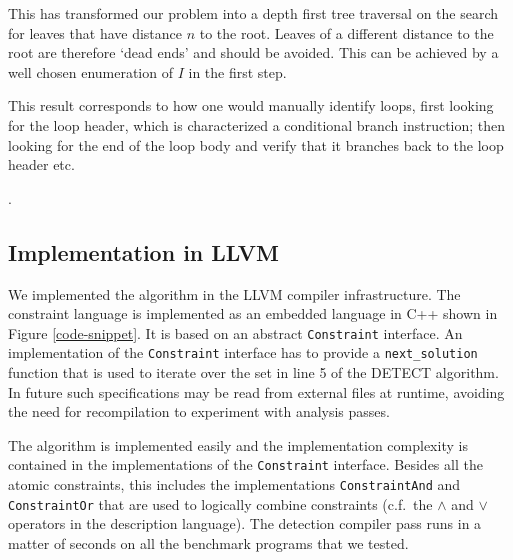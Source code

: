 This has transformed our problem into a depth first tree traversal on the search for leaves that have distance $n$ to the root.
Leaves of a different distance to the root are therefore `dead ends' and should be avoided.
This can be achieved by a well chosen enumeration of $I$ in the first step.

This result corresponds to how one would manually identify loops,
 first looking for the loop header, which is
characterized a conditional branch instruction; then looking
for the end of the loop body and verify that it branches back to the
loop header etc.

.

\subsection{Implementation in LLVM}
We implemented the algorithm in the LLVM compiler infrastructure.  The
constraint language is implemented as an embedded language in C++ shown in Figure
\ref{code-snippet}.
It is based on an abstract \texttt{Constraint} interface.
An implementation of the \texttt{Constraint}
interface has to provide a \texttt{next\_solution} function that is
used to iterate over the set in line 5 of the DETECT algorithm.  In
future such specifications may be read from external files at runtime,
avoiding the need for recompilation to experiment with analysis
passes.

The algorithm is implemented easily and the implementation complexity is contained in the implementations of the \texttt{Constraint} interface.
Besides all the atomic constraints, this includes the implementations \texttt{ConstraintAnd} and \texttt{ConstraintOr} that are used to logically combine constraints (c.f.\ the $\land$ and $\lor$ operators in the description language).
The detection compiler pass runs in a matter of seconds on all the benchmark programs that we tested.



